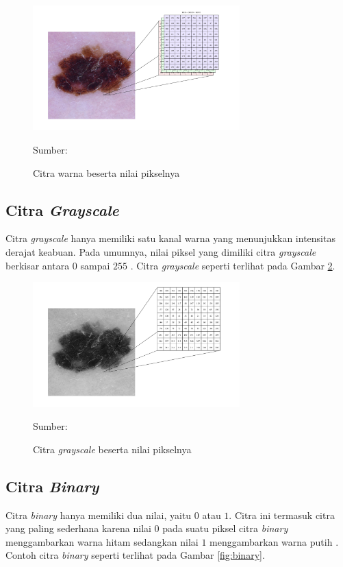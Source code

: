     \begin{figure}[H]
        \begin{center}
            \includegraphics[width=8cm]{img/bab2/warna.png}
            \caption{Citra warna beserta nilai pikselnya}
            \label{fig:color}
            Sumber: \citep{Kusumanto2011}
        \end{center}
    \end{figure}

    \subsection{Citra \textit{Grayscale}}
    Citra \textit{grayscale} hanya memiliki satu kanal warna yang menunjukkan intensitas derajat keabuan. Pada umumnya, nilai piksel yang dimiliki citra \textit{grayscale} berkisar antara $0$ sampai $255$ \citep{Kusumanto2011}. Citra \textit{grayscale} seperti terlihat pada Gambar \ref{fig:grayscale}.

    \begin{figure}[H]
        \begin{center}
            \includegraphics[width=8cm]{img/bab2/grayscale.png}
            \caption{Citra \textit{grayscale} beserta nilai pikselnya}
            \label{fig:grayscale}
            Sumber: \citep{Kusumanto2011}
        \end{center}
    \end{figure}

    \subsection{Citra \textit{Binary}}
    Citra \textit{binary} hanya memiliki dua nilai, yaitu $0$ atau $1$. Citra ini termasuk citra yang paling sederhana karena nilai $0$ pada suatu piksel citra \textit{binary} menggambarkan warna hitam sedangkan nilai $1$ menggambarkan warna putih \citep{Kusumanto2011}. Contoh citra \textit{binary} seperti terlihat pada Gambar \ref{fig:binary}.

